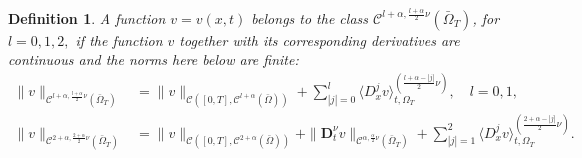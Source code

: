 \documentclass[10pt,a4paper]{amsart}
\newtheorem{definition}{Definition}
\def\C {\mathcal{C}}
\begin{document}
\begin{definition}\label{d2.1}
 A function $v=v(x,t)$ belongs to the class $\C^{l+\alpha,\frac{l+\alpha}{2}\nu}(\bar{\Omega}_{T})$, for $l=0,1,2,$ if the function $v$ together with its corresponding derivatives are continuous and the norms here below are finite:
\begin{align*}
\|v\|_{\C^{l+\alpha,\frac{l+\alpha}{2}\nu}(\bar{\Omega}_{T})} &=
\|v\|_{\C([0,T],
\C^{l+\alpha}(\bar{\Omega}))}+\sum_{|j|=0}^{l}\langle
D_{x}^{j}v\rangle^{(\frac{l+\alpha-|j|}{2}\nu)}_{t,{\Omega}_{T}},
\quad
l=0,1,\\
\|v\|_{\C^{2+\alpha,\frac{2+\alpha}{2}\nu}(\bar{\Omega}_{T})}
&=\|v\|_{\C([0,T],
\C^{2+\alpha}(\bar{\Omega}))}+\|\mathbf{D}_{t}^{\nu}v\|_{\C^{\alpha,\frac{\alpha}{2}\nu}
(\bar{\Omega}_{T})}+\sum_{|j|=1}^{2}\langle
D_{x}^{j}v\rangle^{(\frac{2+\alpha-|j|}{2}\nu)}_{t,{\Omega}_{T}}.
\end{align*}
\end{definition}
\end{document}

